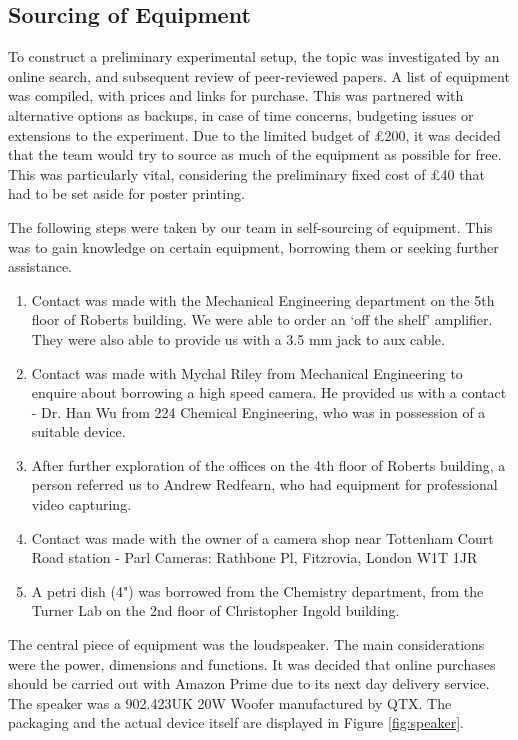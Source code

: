 \subsection{Sourcing of Equipment}

To construct a preliminary experimental setup, the topic was investigated by an online search, and subsequent review of peer-reviewed papers. A list of equipment was compiled, with prices and links for purchase. This was partnered with alternative options as backups, in case of time concerns, budgeting issues or extensions to the experiment. Due to the limited budget of \pounds200, it was decided that the team would try to source as much of the equipment as possible for free. This was particularly vital, considering the preliminary fixed cost of \pounds40 that had to be set aside for poster printing.

The following steps were taken by our team in self-sourcing of equipment. This was to gain knowledge on certain equipment, borrowing them or seeking further assistance.

\begin{enumerate}
\item  Contact was made with the Mechanical Engineering department on the 5th floor of  Roberts building. We were able to order an `off the shelf' amplifier.  They were also able to provide us with a 3.5 mm jack to aux cable.
\item  Contact was made with Mychal Riley from Mechanical Engineering to enquire about borrowing a high speed camera. He provided us with a contact - Dr. Han Wu from 224  Chemical Engineering, who was in possession of a suitable device.
\item  After further exploration of the offices on the 4th floor of Roberts  building, a person referred us to Andrew Redfearn, who had equipment for professional video capturing.
\item  Contact was made with the owner of a camera shop near Tottenham Court Road station  - Parl Cameras: Rathbone Pl, Fitzrovia, London W1T 1JR
\item  A petri dish (4") was borrowed from the Chemistry department, from the Turner Lab  on the 2nd floor of Christopher Ingold building.
\end{enumerate}

The central piece of equipment was the loudspeaker. The main considerations were the power, dimensions and functions. It was decided that online purchases should be carried out with Amazon Prime due to its next day delivery service. The speaker was a 902.423UK 20W Woofer manufactured by QTX. The packaging and the actual device itself are displayed in Figure \ref{fig:speaker}.

